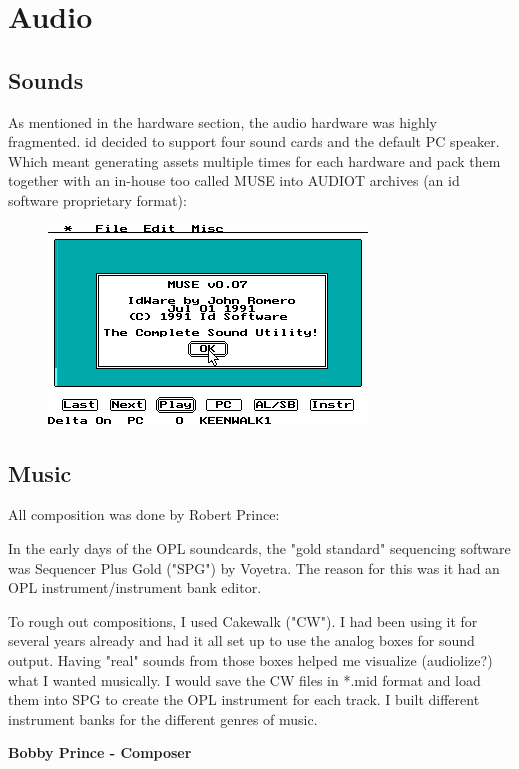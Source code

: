 \documentclass[book.tex]{subfiles}
\begin{document}
\section{Audio}

\subsection{Sounds}
As mentioned in the hardware section, the audio hardware was highly fragmented. id decided to support four sound cards and the default PC speaker. Which meant generating assets multiple times for each hardware and pack them together with an in-house too called MUSE into AUDIOT archives (an id software proprietary format):\\
\begin{figure}[H]
\centering
 \includegraphics[width=\textwidth]{screenshots/muse.png}
 \end{figure}
 \par
{}


\subsection{Music}
All composition was done by Robert Prince:\\
\par
 \begin{fancyquotes}
In the early days of the OPL soundcards, the "gold standard" sequencing software was Sequencer Plus Gold ("SPG") by Voyetra. The reason for this was it had an OPL instrument/instrument bank editor.\\
\par
To rough out compositions, I used Cakewalk ("CW"). I had been using it for several years already and had it all set up to use the analog boxes for sound output. Having "real" sounds from those boxes helped me visualize (audiolize?) what I wanted musically. I would save the CW files in *.mid format and load them into SPG to create the OPL instrument for each track. I built different instrument banks for the different genres of music.

\textbf{Bobby Prince - Composer}
 \end{fancyquotes}\\
\end{document}
